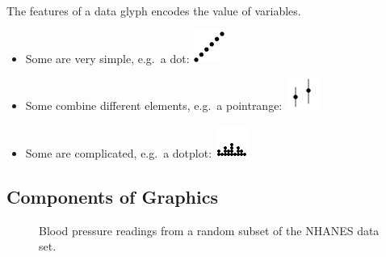 \documentclass[
  letterpaper,
  DIV=11,
  numbers=noendperiod]{scrreprt}
\providecommand{\tightlist}{%
  \setlength{\itemsep}{0pt}\setlength{\parskip}{0pt}}\usepackage{longtable,booktabs,array}
\begin{document}
The features of a data glyph encodes the value of variables.

\begin{itemize}
\tightlist
\item
  Some are very simple, e.g.~a dot:
  \includegraphics{src/../images/geom_point.png}
\item
  Some combine different elements, e.g.~a pointrange:
  \includegraphics{src/../images/geom_pointrange.png}
\item
  Some are complicated, e.g.~a dotplot:
  \includegraphics{src/../images/geom_dotplot.png}
\end{itemize}

\subsection*{Components of Graphics}\label{components-of-graphics}

\begin{figure}


\caption{\label{fig-bp}Blood pressure readings from a random subset of
the NHANES data set.}

\end{figure}%
\end{document}

